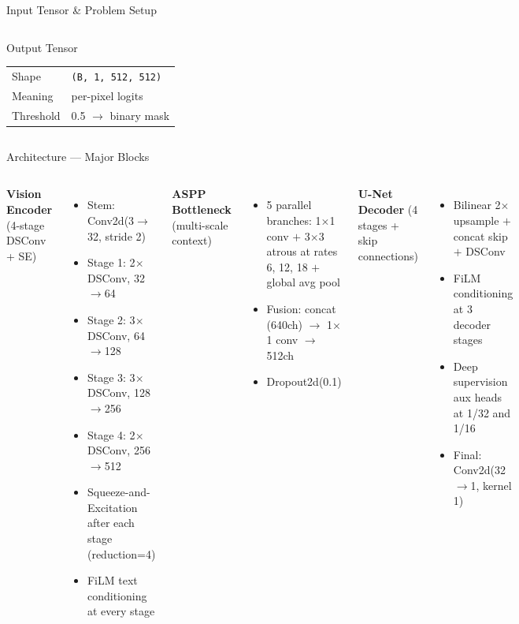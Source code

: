 \documentclass[aspectratio=169, 10pt]{beamer}
\begin{document}
\begin{frame}{Input Tensor \& Problem Setup}
\begin{columns}[T]
\begin{block}{Output Tensor}
\begin{tabular}{@{}ll@{}}
Shape     & \texttt{(B, 1, 512, 512)} \\
Meaning   & per-pixel logits \\
Threshold & 0.5 $\to$ binary mask \\
\end{tabular}
\end{block}

\end{columns}
\end{frame}

\begin{frame}{Architecture --- Major Blocks}
\footnotesize

\begin{columns}[T]

\textbf{Vision Encoder} (4-stage DSConv + SE)
\begin{itemize}
  \item Stem: Conv2d(3$\to$32, stride 2)
  \item Stage 1: 2$\times$ DSConv, 32$\to$64
  \item Stage 2: 3$\times$ DSConv, 64$\to$128
  \item Stage 3: 3$\times$ DSConv, 128$\to$256
  \item Stage 4: 2$\times$ DSConv, 256$\to$512
  \item Squeeze-and-Excitation after each stage (reduction=4)
  \item FiLM text conditioning at every stage
\end{itemize}

\medskip
\textbf{ASPP Bottleneck} (multi-scale context)
\begin{itemize}
  \item 5 parallel branches: 1$\times$1 conv $+$ 3$\times$3 atrous at rates 6, 12, 18 $+$ global avg pool
  \item Fusion: concat (640ch) $\to$ 1$\times$1 conv $\to$ 512ch
  \item Dropout2d(0.1)
\end{itemize}


\textbf{U-Net Decoder} (4 stages + skip connections)
\begin{itemize}
  \item Bilinear 2$\times$ upsample $+$ concat skip $+$ DSConv
  \item FiLM conditioning at 3 decoder stages
  \item Deep supervision aux heads at 1/32 and 1/16
  \item Final: Conv2d(32$\to$1, kernel 1)
\end{itemize}


\end{columns}
\end{frame}
\end{document}
